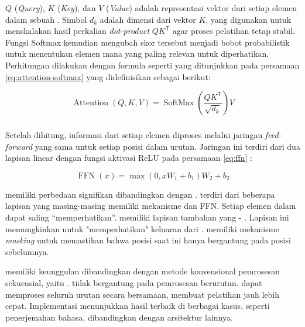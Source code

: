 $Q$ (\emph{Query}), $K$ (\emph{Key}), dan $V$ (\emph{Value}) adalah representasi vektor dari setiap elemen dalam sebuah \sequence. Simbol $d_k$ adalah dimensi dari vektor $K$, yang digunakan untuk menskalakan hasil perkalian \emph{dot-product} $QK^\mathsf{T}$ agar proses pelatihan tetap stabil. Fungsi Softmax kemudian mengubah skor tersebut menjadi bobot probabilistik untuk menentukan elemen mana yang paling relevan untuk diperhatikan.
\newpage
Perhitungan \attention{} dilakukan dengan formula seperti yang ditunjukkan pada persamaan \eqref{eq:attention-softmax} \parencite{vaswani2017attention} yang didefinisikan sebagai berikut:

\begin{equation}
	\label{eq:attention-softmax}
		\operatorname{Attention}(Q, K, V) = \operatorname{SoftMax}\left(\frac{QK^\mathsf{T}}{\sqrt{d_k}}\right)V
\end{equation}

\subsubsection{\ffnfull}
Setelah \attention{} dihitung, informasi dari setiap elemen diproses melalui jaringan \emph{feed-forward} yang sama untuk setiap posisi dalam urutan. Jaringan ini terdiri dari dua lapisan linear dengan fungsi aktivasi ReLU pada persamaan \eqref{eq:ffn} \parencite{vaswani2017attention}:

\begin{equation}
	\label{eq:ffn}
	\operatorname{FFN}(x) = \max(0, xW_1 + b_1)W_2 + b_2
\end{equation}

\decoderfl{} memiliki perbedaan signifikan dibandingkan dengan \encoder. \encoderfl{} terdiri dari beberapa lapisan yang masing-masing memiliki mekanisme \selfattention{} dan FFN. Setiap elemen dalam \sequence{} dapat saling “memperhatikan”. \decoderfl{} memiliki lapisan tambahan yang \encoder{}\--\decoder{} \attention. Lapisan ini memungkinkan \decoder{} untuk "memperhatikan" keluaran dari \encoder. \decoderfl{} memiliki mekanisme \emph{masking} untuk memastikan bahwa posisi saat ini hanya bergantung pada posisi sebelumnya.

\transformer{} memiliki keunggulan dibandingkan dengan metode konvensional pemrosesan sekuensial, yaitu \rnn. \transformer{} tidak bergantung pada pemrosesan berurutan. \transformer{} dapat memproses seluruh urutan secara bersamaan, membuat pelatihan jauh lebih cepat. Implementasi \transformer{} menunjukkan hasil terbaik di berbagai kasus, seperti penerjemahan bahasa, dibandingkan dengan arsitektur lainnya.
